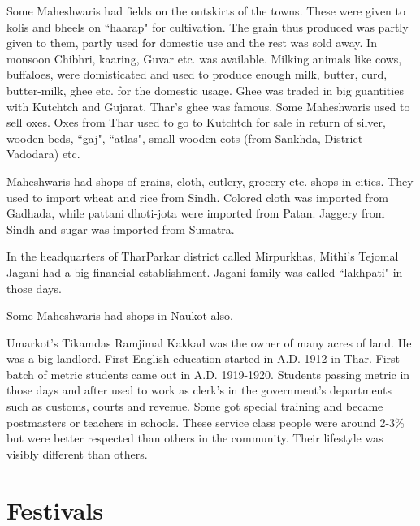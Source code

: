 Some Maheshwaris had fields on the outskirts of the towns. These were given to kolis and bheels on ``haarap" for cultivation. The grain thus produced was partly given to them, partly used for domestic use and the rest was sold away. In monsoon Chibhri, kaaring, Guvar etc. was available. Milking animals like cows, buffaloes, were domisticated and used to produce enough milk, butter, curd, butter-milk, ghee etc. for the domestic usage. Ghee was traded in big guantities with Kutchtch and Gujarat. Thar's ghee was famous. Some Maheshwaris used to sell oxes. Oxes from Thar used to go to Kutchtch for sale in return of silver, wooden beds, ``gaj", ``atlas", small wooden cots (from Sankhda, District Vadodara) etc.

Maheshwaris had shops of grains, cloth, cutlery, grocery etc. shops in cities. They used to import wheat and rice from Sindh. Colored cloth was imported from Gadhada, while pattani dhoti-jota were imported from Patan. Jaggery from Sindh and sugar was imported from Sumatra.

In the headquarters of TharParkar district called Mirpurkhas, Mithi's Tejomal Jagani had a big financial establishment. Jagani family was called ``lakhpati" in those days.

Some Maheshwaris had shops in Naukot also.

Umarkot's Tikamdas Ramjimal Kakkad was the owner of many acres of land. He was a big landlord. First English education started in A.D. 1912 in Thar. First batch of metric students came out in A.D. 1919-1920. Students passing metric  in those days and after used to work as clerk's in the government's departments such as customs, courts and revenue. Some got special training and became postmasters or teachers in schools. These service class people were around 2-3\% but were better respected than others in the community. Their lifestyle was visibly different than others.
\section{Festivals}
